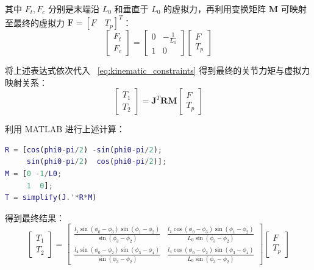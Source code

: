 其中 $F_t, F_c$ 分别是末端沿 $L_0$ 和垂直于 $L_0$ 的虚拟力，再利用变换矩阵 $\boldsymbol{M}$ 可映射至最终的虚拟力 $\boldsymbol{F} = [F \quad T_p]^T$：
\begin{equation}
    \begin{bmatrix}
        F_t \\ F_c
    \end{bmatrix} = 
    \begin{bmatrix}
        0 & -\frac{1}{L_0} \\
        1 & 0
    \end{bmatrix}
    \begin{bmatrix}
        F \\ T_p
    \end{bmatrix}
\end{equation}

将上述表达式依次代入 ~\ref{eq:kinematic_constraints} 得到最终的关节力矩与虚拟力映射关系：
\begin{equation}
    \begin{bmatrix}
        T_1 \\ T_2
    \end{bmatrix} = \boldsymbol{J}^T \boldsymbol{R} \boldsymbol{M}
    \begin{bmatrix}
        F \\ T_p
    \end{bmatrix}
\end{equation}

利用 MATLAB 进行上述计算：
\begin{lstlisting}[language=Matlab]
R = [cos(phi0-pi/2) -sin(phi0-pi/2);
     sin(phi0-pi/2)  cos(phi0-pi/2)];
M = [0 -1/L0;
     1  0];
T = simplify(J.'*R*M)
\end{lstlisting}

得到最终结果：
\begin{equation}
    \begin{bmatrix}
        T_1 \\ T_2
    \end{bmatrix} = 
    \begin{bmatrix}
        \frac{l_1 \sin(\phi_0 - \phi_3) \sin(\phi_1 - \phi_2)}{\sin(\phi_3 - \phi_2)} & \frac{l_1 \cos(\phi_0 - \phi_3) \sin(\phi_1 - \phi_2)}{L_0 \sin(\phi_3 - \phi_2)} \\
        \frac{l_4 \sin(\phi_0 - \phi_2) \sin(\phi_3 - \phi_4)}{\sin(\phi_3 - \phi_2)} & \frac{l_4 \cos(\phi_0 - \phi_2) \sin(\phi_3 - \phi_4)}{L_0 \sin(\phi_3 - \phi_2)}
    \end{bmatrix}
    \begin{bmatrix}
        F \\ T_p
    \end{bmatrix}
\end{equation}


